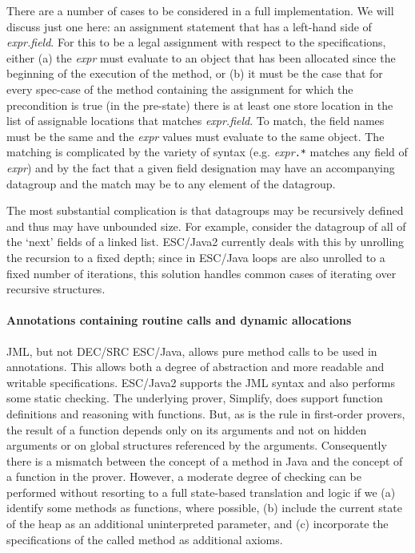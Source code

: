 \documentclass{llncs}
\begin{document}
There are a number of cases to be considered in a full implementation.
We will discuss just one here: an assignment statement that has a
left-hand side of \textit{expr.field}.  For this to be a legal
assignment with respect to the specifications, either (a) the
\textit{expr} must evaluate to an object that has been allocated since
the beginning of the execution of the method, or (b) it must be the
case that for every spec-case of the method containing the assignment
for which the precondition is true (in the pre-state) there is at
least one store location in the list of assignable locations that
matches \textit{expr.field}.  To match, the field names must be the
same and the \textit{expr} values must evaluate to the same object.
The matching is complicated by the variety of syntax (e.g.
\textit{expr}\texttt{.*} matches any field of \textit{expr}) and by
the fact that a given field designation may have an accompanying
datagroup and the match may be to any element of the datagroup.

The most substantial complication is that datagroups may be
recursively defined and thus may have unbounded size.  For example,
consider the datagroup of all of the `next' fields of a linked list.
ESC/Java2 currently deals with this by unrolling the recursion to a
fixed depth; since in ESC/Java loops are also unrolled to a fixed
number of iterations, this solution handles common cases of iterating
over recursive structures.

\paragraph*{Annotations containing routine calls and dynamic allocations}
JML, but not DEC/SRC ESC/Java, allows pure method calls to be used in
annotations.  This allows both a degree of abstraction and more
readable and writable specifications.  ESC/Java2 supports the JML
syntax and also performs some static checking.  The underlying prover,
Simplify, does support function definitions and reasoning with
functions.  But, as is the rule in first-order provers, the result of
a function depends only on its arguments and not on hidden arguments
or on global structures referenced by the arguments.  Consequently
there is a mismatch between the concept of a method in Java and the
concept of a function in the prover.  However, a moderate degree of
checking can be performed without resorting to a full state-based
translation and logic if we (a) identify some methods as functions,
where possible, (b) include the current state of the heap as an
additional uninterpreted parameter, and (c) incorporate the
specifications of the called method as additional axioms.
\end{document}
